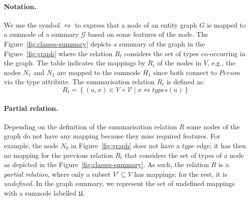 \paragraph{Notation.}

We use the symbol $\leftrightsquigarrow$ to express that a node of an entity graph $G$ is mapped to a sumnode of a summary $\mathcal{G}$ based on some features of the node.
The Figure~\ref{fig:classes-summary} depicts a summary of the graph in the Figure~\ref{fig:graph} where the relation $R_t$ considers the set of types co-occurring in the graph. The table indicates the mappings by $R_t$ of the nodes in $V$, e.g., the nodes $N_1$ and $N_2$ are mapped to the sumnode $H_1$ since both connect to $Person$ via the type attribute. The summarisation relation $R_t$ is defined as:
$$
R_t = \left\lbrace (u, x) \in V \times \mathcal{V} \mid x \leftrightsquigarrow types(u) \right\rbrace
$$


\paragraph{Partial relation.}

Depending on the definition of the summarisation relation $R$ some nodes of the graph do not have any mapping because they miss required features. For example, the node $N_0$ in Figure~\ref{fig:graph} does not have a $type$ edge; it has then no mapping for the previous relation $R_t$ that considers the set of types of a node as depicted in the Figure~\ref{fig:classes-summary}. As such, the relation $R$ is a \emph{partial relation}, where only a subset $V' \subseteq V$ has mappings; for the rest, it is \emph{undefined}. In the graph summary, we represent the set of undefined mappings with a sumnode labelled $\mathfrak{U}$.

